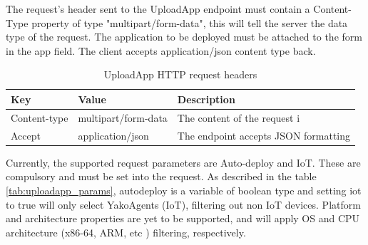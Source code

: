             
                The request's header sent to the UploadApp endpoint must contain a Content-Type \cite{mdn_content-type_nodate} property of type "multipart/form-data", this will tell the server the data type of the request. The application to be deployed must be attached to the form in the app field. The client accepts application/json content type back.
                
                \begin{table}[H]
                    \centering
                    \caption{UploadApp HTTP request headers}
                    \begin{tabular}{|l|l|l|}
                    \hline
                    \rowcolor[HTML]{C0C0C0} 
                    \textbf{Key} & \textbf{Value} & \textbf{Description} \\ \hline
                    Content-type & multipart/form-data & The content of the request i \\ \hline
                    Accept & application/json & The endpoint accepts JSON formatting \\ \hline
                    \end{tabular}
                    \label{tab:uploadapp_headers}
                \end{table}
        
                Currently, the supported request parameters are Auto-deploy and IoT. These are compulsory and must be set into the request. As described in the table \ref{tab:uploadapp_params}, autodeploy is a variable of boolean type and setting iot to true will only select YakoAgents (IoT), filtering out non IoT devices. Platform and architecture properties are yet to be supported, and will apply OS and CPU architecture (x86-64, ARM, etc \cite{academic_list_nodate}) filtering, respectively.
                
